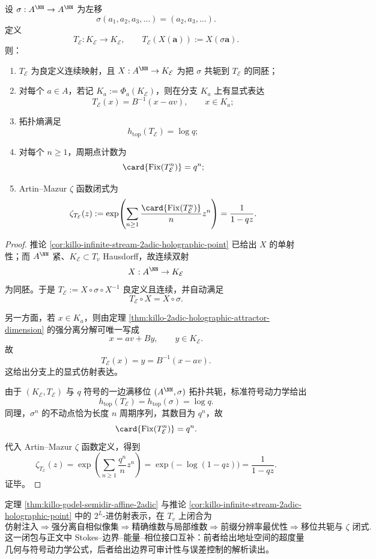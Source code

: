 \begin{theorem}\label{thm:killo-2adic-holographic-shift-dynamics}
设 \(\sigma:A^\NN\to A^\NN\) 为左移
\[
\sigma(a_1,a_2,a_3,\dots)=(a_2,a_3,\dots).
\]
定义
\[
T_{\mathcal E}:K_{\mathcal E}\to K_{\mathcal E},\qquad
T_{\mathcal E}(X(\mathbf a)):=X(\sigma\mathbf a).
\]
则：
\begin{enumerate}
  \item \(T_{\mathcal E}\) 为良定义连续映射，且 \(X:A^\NN\to K_{\mathcal E}\) 为把 \(\sigma\) 共轭到 \(T_{\mathcal E}\) 的同胚；
  \item 对每个 \(a\in A\)，若记 \(K_a:=\Phi_a(K_{\mathcal E})\)，则在分支 \(K_a\) 上有显式表达
  \[
  T_{\mathcal E}(x)=B^{-1}(x-av),\qquad x\in K_a;
  \]
  \item 拓扑熵满足
  \[
  h_{\mathrm{top}}(T_{\mathcal E})=\log q;
  \]
  \item 对每个 \(n\ge 1\)，周期点计数为
  \[
  \card{\mathrm{Fix}(T_{\mathcal E}^n)}=q^n;
  \]
  \item Artin--Mazur \(\zeta\) 函数闭式为
  \[
  \zeta_{T_{\mathcal E}}(z)
  :=
  \exp\!\left(\sum_{n\ge 1}\frac{\card{\mathrm{Fix}(T_{\mathcal E}^n)}}{n}z^n\right)
  =
  \frac{1}{1-qz}.
  \]
\end{enumerate}
\end{theorem}
\begin{proof}
推论 \ref{cor:killo-infinite-stream-2adic-holographic-point} 已给出 \(X\) 的单射性；而 \(A^\NN\) 紧、\(K_{\mathcal E}\subset T_v\) Hausdorff，故连续双射
\[
X:A^\NN\to K_{\mathcal E}
\]
为同胚。于是 \(T_{\mathcal E}:=X\circ \sigma\circ X^{-1}\) 良定义且连续，并自动满足
\[
T_{\mathcal E}\circ X=X\circ \sigma.
\]

另一方面，若 \(x\in K_a\)，则由定理 \ref{thm:killo-2adic-holographic-attractor-dimension} 的强分离分解可唯一写成
\[
x=av+By,\qquad y\in K_{\mathcal E}.
\]
故
\[
T_{\mathcal E}(x)=y=B^{-1}(x-av).
\]
这给出分支上的显式仿射表达。

由于 \((K_{\mathcal E},T_{\mathcal E})\) 与 \(q\) 符号的一边满移位 \((A^\NN,\sigma)\) 拓扑共轭，标准符号动力学给出
\[
h_{\mathrm{top}}(T_{\mathcal E})=h_{\mathrm{top}}(\sigma)=\log q.
\]
同理，\(\sigma^n\) 的不动点恰为长度 \(n\) 周期序列，其数目为 \(q^n\)，故
\[
\card{\mathrm{Fix}(T_{\mathcal E}^n)}=q^n.
\]
代入 Artin--Mazur \(\zeta\) 函数定义，得到
\[
\zeta_{T_{\mathcal E}}(z)
=
\exp\!\left(\sum_{n\ge 1}\frac{q^n}{n}z^n\right)
=
\exp\!\bigl(-\log(1-qz)\bigr)
=
\frac{1}{1-qz}.
\]
证毕。
\end{proof}

\begin{remark}\label{rem:killo-2adic-holographic-closure}
定理 \ref{thm:killo-godel-semidir-affine-2adic} 与推论 \ref{cor:killo-infinite-stream-2adic-holographic-point} 中的 \(2^L\)-进仿射表示，在 \(T_v\) 上闭合为
\[
\text{仿射注入}
\Longrightarrow
\text{强分离自相似像集}
\Longrightarrow
\text{精确维数与局部维数}
\Longrightarrow
\text{前缀分辨率最优性}
\Longrightarrow
\text{移位共轭与 }\zeta\text{ 闭式}.
\]
这一闭包与正文中 Stokes--边界--能量--相位接口互补：前者给出地址空间的超度量几何与符号动力学公式，后者给出边界可审计性与误差控制的解析读出。
\end{remark}
